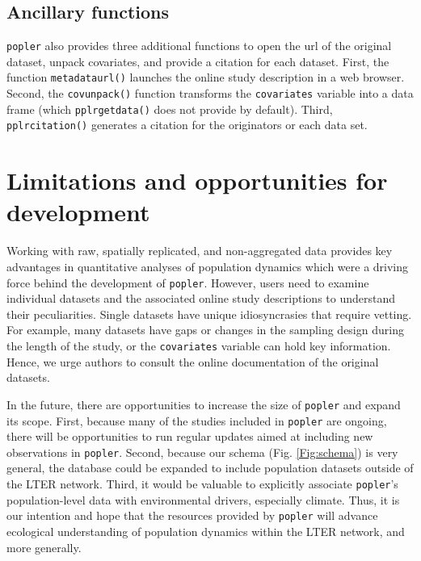 \documentclass{article}\usepackage[]{graphicx}\usepackage[]{color}
\begin{document}
\subsection*{Ancillary functions}
\texttt{popler} also provides three additional functions to open the url of the original dataset, unpack covariates, and provide a citation for each dataset. First, the function \texttt{metadata\textunderscore url()} launches the online study description in a web browser. Second, the \texttt{cov\textunderscore unpack()} function transforms the \texttt{covariates} variable into a data frame (which \texttt{pplr\textunderscore get\textunderscore data()} does not provide by default). Third, \texttt{pplr\textunderscore citation()} generates a citation for the originators or each data set. 

\section*{Limitations and opportunities for development}
Working with raw, spatially replicated, and non-aggregated data provides key advantages in quantitative analyses of population dynamics which were a driving force behind the development of \texttt{popler}. However, users need to examine individual datasets and the associated online study descriptions to understand their peculiarities. Single datasets have unique idiosyncrasies that require vetting. For example, many datasets have gaps or changes in the sampling design during the length of the study, or the  \texttt{covariates} variable can hold key information. Hence, we urge authors to consult the online documentation of the original datasets.

In the future, there are opportunities to increase the size of \texttt{popler} and expand its scope. First, because many of the studies included in \texttt{popler} are ongoing, there will be opportunities to run regular updates aimed at including new observations in \texttt{popler}. Second, because our schema (Fig. \ref{Fig:schema}) is very general, the database could be expanded to include population datasets outside of the LTER network. Third, it would be valuable to explicitly associate \texttt{popler}'s population-level data with environmental drivers, especially climate. Thus, it is our intention and hope that the resources provided by \texttt{popler} will advance ecological understanding of population dynamics within the LTER network, and more generally.
\end{document}
